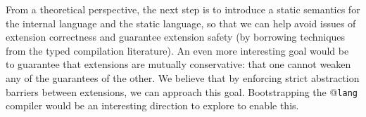 \documentclass[9pt,preprint]{sigplanconf}
\begin{document}
From a theoretical perspective, the next step is to introduce a static semantics for the internal language and the static language, so that we can help avoid issues of extension correctness and guarantee extension safety (by borrowing techniques from the typed compilation literature). An even more interesting goal would be to guarantee that extensions are mutually conservative: that one cannot weaken any of the guarantees of the other. We believe that by enforcing strict abstraction barriers between extensions, we can approach this goal. Bootstrapping the @\texttt{lang} compiler would be an interesting direction to explore to enable this.
% 
\end{document}
